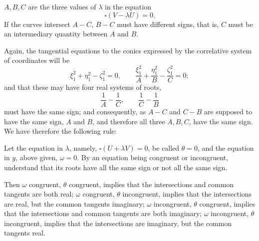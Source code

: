 \documentclass[11pt]{article}
\newcommand{\sourcepage}[1]{\marginpar{\scriptsize p.~#1}}
\begin{document}
{{$A,B,C$ are the three values of $\lambda$ in the equation
\[
 \square(V-\lambda U)=0.
\]
If the curves intersect $A-C$, $B-C$ must have different signs, that is, $C$ must be an intermediary quantity between $A$ and $B$.

Again, the tangential equations to the conics expressed by the correlative system of coordinates will be
\[
 \xi_1^2+\eta_1^2-\zeta_1^2=0,
 \qquad
 \frac{\xi_1^2}{A}+\frac{\eta_1^2}{B}-\frac{\zeta_1^2}{C}=0;
\]
and that these may have four real systems of roots,
\[
 \frac1A-\frac1C,
 \qquad
 \frac1C-\frac1B
\]
must have the same sign; and consequently, as $A-C$ and $C-B$ are \sourcepage{164} supposed to have the same sign, $A$ and $B$, and therefore all three $A,B,C$, have the same sign. We have therefore the following rule:

Let the equation in $\lambda$, namely, $\square(U+\lambda V)=0$, be called $\theta=0$, and the equation in $y$, above given, $\omega=0$. By an equation being congruent or incongruent, understand that its roots have all the same sign or not all the same sign.

Then $\omega$ congruent, $\theta$ congruent, implies that the intersections and common tangents are both real; $\omega$ congruent, $\theta$ incongruent, implies that the intersections are real, but the common tangents imaginary; $\omega$ incongruent, $\theta$ congruent, implies that the intersections and common tangents are both imaginary; $\omega$ incongruent, $\theta$ incongruent, implies that the intersections are imaginary, but the common tangents real.

}}
\end{document}

